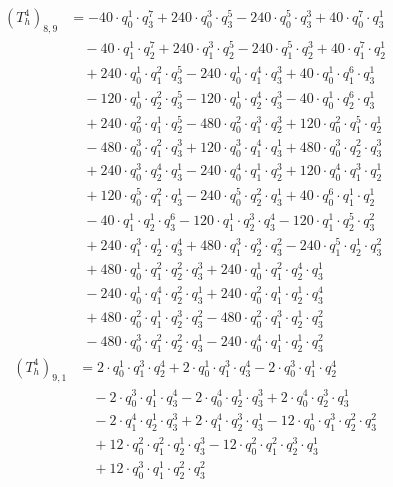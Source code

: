 \begin{align*}(T_{h}^4)_{8,9}&=-40\cdot q_0^{1}\cdot q_3^{7}+240\cdot q_0^{3}\cdot q_3^{5}-240\cdot q_0^{5}\cdot q_3^{3}+40\cdot q_0^{7}\cdot q_3^{1}\\
&\quad -40\cdot q_1^{1}\cdot q_2^{7}+240\cdot q_1^{3}\cdot q_2^{5}-240\cdot q_1^{5}\cdot q_2^{3}+40\cdot q_1^{7}\cdot q_2^{1}\\
&\quad +240\cdot q_0^{1}\cdot q_1^{2}\cdot q_3^{5}-240\cdot q_0^{1}\cdot q_1^{4}\cdot q_3^{3}+40\cdot q_0^{1}\cdot q_1^{6}\cdot q_3^{1}\\
&\quad -120\cdot q_0^{1}\cdot q_2^{2}\cdot q_3^{5}-120\cdot q_0^{1}\cdot q_2^{4}\cdot q_3^{3}-40\cdot q_0^{1}\cdot q_2^{6}\cdot q_3^{1}\\
&\quad +240\cdot q_0^{2}\cdot q_1^{1}\cdot q_2^{5}-480\cdot q_0^{2}\cdot q_1^{3}\cdot q_2^{3}+120\cdot q_0^{2}\cdot q_1^{5}\cdot q_2^{1}\\
&\quad -480\cdot q_0^{3}\cdot q_1^{2}\cdot q_3^{3}+120\cdot q_0^{3}\cdot q_1^{4}\cdot q_3^{1}+480\cdot q_0^{3}\cdot q_2^{2}\cdot q_3^{3}\\
&\quad +240\cdot q_0^{3}\cdot q_2^{4}\cdot q_3^{1}-240\cdot q_0^{4}\cdot q_1^{1}\cdot q_2^{3}+120\cdot q_0^{4}\cdot q_1^{3}\cdot q_2^{1}\\
&\quad +120\cdot q_0^{5}\cdot q_1^{2}\cdot q_3^{1}-240\cdot q_0^{5}\cdot q_2^{2}\cdot q_3^{1}+40\cdot q_0^{6}\cdot q_1^{1}\cdot q_2^{1}\\
&\quad -40\cdot q_1^{1}\cdot q_2^{1}\cdot q_3^{6}-120\cdot q_1^{1}\cdot q_2^{3}\cdot q_3^{4}-120\cdot q_1^{1}\cdot q_2^{5}\cdot q_3^{2}\\
&\quad +240\cdot q_1^{3}\cdot q_2^{1}\cdot q_3^{4}+480\cdot q_1^{3}\cdot q_2^{3}\cdot q_3^{2}-240\cdot q_1^{5}\cdot q_2^{1}\cdot q_3^{2}\\
&\quad +480\cdot q_0^{1}\cdot q_1^{2}\cdot q_2^{2}\cdot q_3^{3}+240\cdot q_0^{1}\cdot q_1^{2}\cdot q_2^{4}\cdot q_3^{1}\\
&\quad -240\cdot q_0^{1}\cdot q_1^{4}\cdot q_2^{2}\cdot q_3^{1}+240\cdot q_0^{2}\cdot q_1^{1}\cdot q_2^{1}\cdot q_3^{4}\\
&\quad +480\cdot q_0^{2}\cdot q_1^{1}\cdot q_2^{3}\cdot q_3^{2}-480\cdot q_0^{2}\cdot q_1^{3}\cdot q_2^{1}\cdot q_3^{2}\\
&\quad -480\cdot q_0^{3}\cdot q_1^{2}\cdot q_2^{2}\cdot q_3^{1}-240\cdot q_0^{4}\cdot q_1^{1}\cdot q_2^{1}\cdot q_3^{2}\end{align*}
\begin{align*}(T_{h}^4)_{9,1}&=2\cdot q_0^{1}\cdot q_1^{3}\cdot q_2^{4}+2\cdot q_0^{1}\cdot q_1^{3}\cdot q_3^{4}-2\cdot q_0^{3}\cdot q_1^{1}\cdot q_2^{4}\\
&\quad -2\cdot q_0^{3}\cdot q_1^{1}\cdot q_3^{4}-2\cdot q_0^{4}\cdot q_2^{1}\cdot q_3^{3}+2\cdot q_0^{4}\cdot q_2^{3}\cdot q_3^{1}\\
&\quad -2\cdot q_1^{4}\cdot q_2^{1}\cdot q_3^{3}+2\cdot q_1^{4}\cdot q_2^{3}\cdot q_3^{1}-12\cdot q_0^{1}\cdot q_1^{3}\cdot q_2^{2}\cdot q_3^{2}\\
&\quad +12\cdot q_0^{2}\cdot q_1^{2}\cdot q_2^{1}\cdot q_3^{3}-12\cdot q_0^{2}\cdot q_1^{2}\cdot q_2^{3}\cdot q_3^{1}\\
&\quad +12\cdot q_0^{3}\cdot q_1^{1}\cdot q_2^{2}\cdot q_3^{2}\end{align*}
